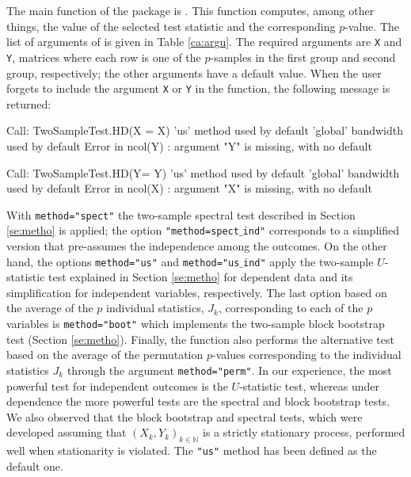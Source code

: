 The main function of the package is .
This function computes, among other things, the value of the selected test statistic and the corresponding $p$-value. The list of arguments of  is given in Table \ref{ca:argu}. The required arguments are 
\texttt{X} and \texttt{Y}, matrices where each row is one of the $p$-samples in the first group and second group, respectively; the other arguments have a default value. When the user forgets to include the
argument \texttt{X} or \texttt{Y} in the function, the following message is returned:

\begin{example}
	Call: 
	TwoSampleTest.HD(X = X)
	'us' method used by default
	'global' bandwidth used by default
	Error in ncol(Y) : argument "Y" is missing, with no default
\end{example}

\begin{example}
	Call: 
	TwoSampleTest.HD(Y= Y)
	'us' method used by default
	'global' bandwidth used by default
	Error in ncol(X) : argument "X" is missing, with no default
\end{example}


With \texttt{method="spect"} the two-sample spectral test described in Section \ref{se:metho} is applied; the option  \texttt{"method=spect$\_$ind"} corresponds to a simplified version that pre-assumes the independence among the outcomes. On the other hand, the options \texttt{method="us"} and \texttt{method="us$\_$ind"} apply the two-sample $U$-statistic test explained in Section \ref{se:metho} for dependent data  and its simplification for independent variables, respectively. The last option based on the average of the $p$ individual
statistics, $J_k$, corresponding to each of the $p$ variables is \texttt{method="boot"} which implements the two-sample block bootstrap test (Section \ref{se:metho}). Finally, the function also performs the alternative test based on the average of the
permutation $p$-values corresponding to the individual statistics $J_k$ through the argument \texttt{method="perm"}.
In our experience, the most powerful test for independent outcomes is the $U$-statistic test,
whereas under dependence the more powerful tests are the spectral and
block bootstrap tests. We also observed that the block
bootstrap and spectral tests, which were developed
assuming that $(X_k,Y_k)_{k\in\mathbb{N}}$ is a strictly stationary
process, performed well when stationarity is violated. The \texttt{"us"} method  has been defined as the default one.

